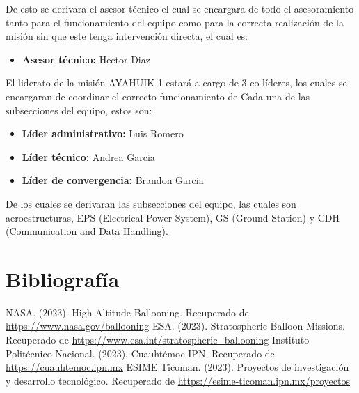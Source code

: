 \documentclass[letterpaper,12pt]{article} %
\begin{document}
    De esto se derivara el asesor técnico el cual se encargara de todo el asesoramiento tanto para el funcionamiento del equipo
    como para la correcta realización de la misión sin que este tenga intervención directa, el cual es:

    \begin{itemize}
        \item \textbf{Asesor técnico:} Hector Diaz

    \end{itemize}


    \vspace{5mm}

    El liderato de la misión AYAHUIK 1 estará a cargo de 3 co-líderes,
    los cuales se encargaran de coordinar el correcto funcionamiento de Cada
    una de las subsecciones del equipo, estos son:

    \begin{itemize}
        \item \textbf{Líder administrativo:} Luis Romero
        \item \textbf{Líder técnico:} Andrea Garcia
        \item \textbf{Líder de convergencia:} Brandon Garcia
    
    \end{itemize}

    De los cuales se derivaran las subsecciones del equipo, las cuales son aeroestructuras, EPS (Electrical Power System), GS (Ground Station) y CDH (Communication and Data Handling).

    \newpage

\section{Bibliografía}
    \begin{thebibliography}{9}
         NASA. (2023). High Altitude Ballooning. Recuperado de \url{https://www.nasa.gov/ballooning}
         ESA. (2023). Stratospheric Balloon Missions. Recuperado de \url{https://www.esa.int/stratospheric_ballooning}
         Instituto Politécnico Nacional. (2023). Cuauhtémoc IPN. Recuperado de \url{https://cuauhtemoc.ipn.mx}
         ESIME Ticoman. (2023). Proyectos de investigación y desarrollo tecnológico. Recuperado de \url{https://esime-ticoman.ipn.mx/proyectos}

    \end{thebibliography}
\end{document}
